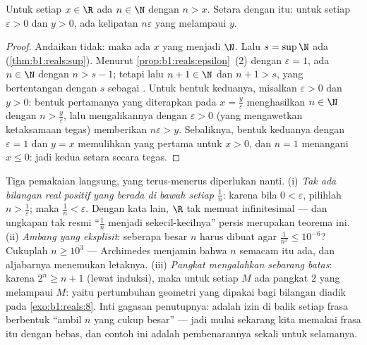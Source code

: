 \begin{theorem}\label{thm:b1:reals:archimedes}
Untuk setiap $x \in \R$ ada $n \in \N$ dengan $n > x$. Setara dengan itu:
untuk setiap $\varepsilon > 0$ dan $y > 0$, ada kelipatan $n\varepsilon$
yang melampaui $y$.
\end{theorem}

\begin{proof}
Andaikan tidak: maka ada $x$ yang menjadi  $\N$. Lalu $s = \sup \N$
ada (\cref{thm:b1:reals:sup}). Menurut
\cref{prop:b1:reals:epsilon}~(2) dengan $\varepsilon = 1$, ada $n
\in \N$ dengan $n > s - 1$; tetapi lalu $n + 1 \in \N$ dan $n + 1 > s$,
yang bertentangan dengan $s$ sebagai . Untuk bentuk keduanya,
misalkan $\varepsilon > 0$ dan $y > 0$: bentuk pertamanya yang diterapkan pada $x
= \frac{y}{\varepsilon}$ menghasilkan $n \in \N$ dengan $n >
\frac{y}{\varepsilon}$, lalu mengalikannya dengan $\varepsilon > 0$
(yang mengawetkan ketaksamaan tegas) memberikan $n\varepsilon > y$.
Sebaliknya, bentuk keduanya dengan $\varepsilon = 1$ dan $y = x$
memulihkan yang pertama untuk $x > 0$, dan $n = 1$ menangani $x \leq 0$:
jadi kedua  setara secara tegas.
\end{proof}

\begin{example}\label{ex:b1:reals:archimedeswork}
Tiga pemakaian langsung, yang terus-menerus diperlukan nanti. (i) \emph{Tak ada
bilangan real positif yang berada di bawah setiap $\frac1n$}: karena bila $0 < \varepsilon$,
pilihlah $n > \frac1\varepsilon$; maka $\frac1n < \varepsilon$. Dengan
kata lain, $\R$ tak memuat infinitesimal --- dan ungkapan tak resmi
``$\frac1n$ menjadi sekecil-kecilnya'' persis merupakan teorema ini.
(ii) \emph{Ambang yang eksplisit}: seberapa besar $n$ harus dibuat agar
$\frac{1}{n^2} \leq 10^{-6}$? Cukuplah $n \geq 10^3$
--- Archimedes menjamin bahwa $n$ semacam itu ada, dan aljabarnya
menemukan letaknya. (iii) \emph{Pangkat mengalahkan sebarang batas}: karena $2^n \geq n +
1$ (lewat induksi), maka untuk setiap $M$ ada pangkat $2$ yang melampaui $M$:
yaitu pertumbuhan geometri yang dipakai bagi bilangan diadik pada
\cref{exo:b1:reals:8}. Inti gagasan penutupnya: 
adalah izin di balik setiap frasa berbentuk ``ambil
$n$ yang cukup besar'' --- jadi mulai sekarang kita memakai frasa itu dengan bebas,
dan contoh ini adalah pembenarannya sekali untuk selamanya.
\end{example}

